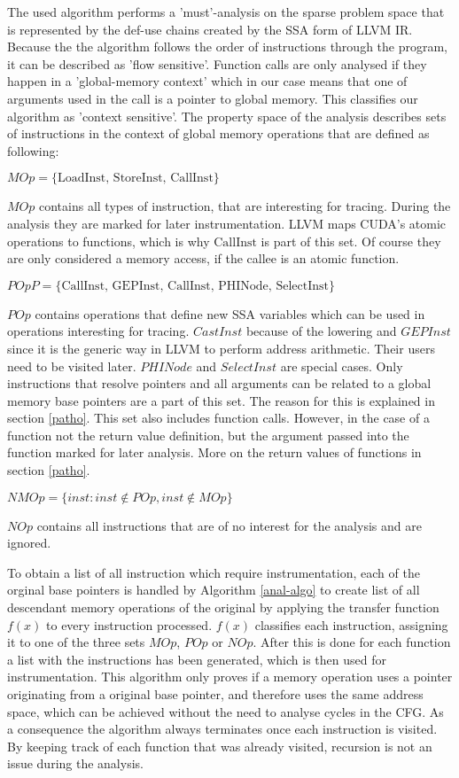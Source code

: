 The used algorithm performs a 'must'-analysis on the sparse problem space that is represented by the def-use chains created by the SSA form of LLVM IR. Because the the algorithm follows the order of instructions through the program, it can be described as 'flow sensitive'. Function calls are only
analysed if they happen in a 'global-memory context' which in our case means that one of arguments used in the call is a pointer to global memory. This classifies our algorithm as 'context sensitive'.
The property space of the analysis describes sets of instructions in the context of global memory operations that are defined
as following:
\begin{defi}\label{mop}
	$	MOp = \{\textrm{LoadInst, StoreInst, CallInst}\} $
\end{defi}
$MOp$ contains all types of instruction, that are interesting for tracing. During the analysis they are marked for later instrumentation. LLVM maps CUDA's atomic operations to functions, which is why $\textrm{CallInst}$ is part of this set. Of course they are only considered a memory access, if the callee is an atomic function.
\begin{defi}\label{mopp}
	$   POpP = \{\textrm{CallInst, GEPInst, CallInst, PHINode, SelectInst}\} $
\end{defi}
$POp$ contains operations that define new SSA variables which can be used in operations interesting for tracing. $CastInst$ because of the lowering  and $GEPInst$ since it is the generic way in LLVM
to perform address arithmetic. Their users need to be visited later. 
$PHINode$ and $SelectInst$ are special cases. Only instructions that resolve pointers and all arguments can be related to a global memory base pointers are a part of this set. The reason for
this is explained in section \ref{patho}.
This set also includes function calls. However, in the case of a function not the return value definition, but the argument passed into the function marked for later analysis. More on the return values of functions in section \ref{patho}.
\begin{defi}\label{nmop}
	$	NMOp = \{inst : inst \notin POp, inst \notin MOp\}$
\end{defi}
$NOp$ contains all instructions that are of no interest for the analysis and are ignored.

To obtain a list of all instruction which require instrumentation, each of the orginal base pointers is handled by Algorithm \ref{anal-algo} to create list of all descendant memory operations of the original by applying the transfer function $f(x)$ to every instruction processed. $f(x)$ classifies each instruction, assigning it to one of the three sets $MOp$, $POp$ or $NOp$. After this is done for each function a list with the instructions has been generated, which is then
used for instrumentation. This algorithm only proves if a memory operation uses a pointer originating from a original base pointer, and therefore uses the same address space, which can be achieved without the need to analyse cycles in the CFG. As a consequence the algorithm always terminates once each instruction is visited. 
By keeping track of each function that was already visited, recursion is not an issue during the analysis.


